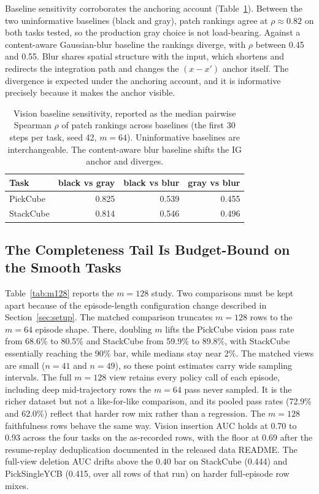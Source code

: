 \documentclass{article}
\begin{document}
Baseline sensitivity corroborates the anchoring account (Table~\ref{tab:baseline}).
Between the two uninformative baselines (black and gray), patch rankings agree at $\rho \approx 0.82$ on both tasks tested, so the production gray choice is not load-bearing.
Against a content-aware Gaussian-blur baseline the rankings diverge, with $\rho$ between 0.45 and 0.55.
Blur shares spatial structure with the input, which shortens and redirects the integration path and changes the $(x - x')$ anchor itself.
The divergence is expected under the anchoring account, and it is informative precisely because it makes the anchor visible.

\begin{table}[t!]
\centering
\small
\begin{tabular}{@{}l rrr@{}}
\toprule
\textbf{Task} & \textbf{black vs gray} & \textbf{black vs blur} & \textbf{gray vs blur} \\
\midrule
PickCube & 0.825 & 0.539 & 0.455 \\
\rowcolor{gray!6}
StackCube & 0.814 & 0.546 & 0.496 \\
\bottomrule
\end{tabular}
\caption{Vision baseline sensitivity, reported as the median pairwise Spearman $\rho$ of patch rankings across baselines (the first 30 steps per task, seed 42, $m{=}64$). Uninformative baselines are interchangeable. The content-aware blur baseline shifts the IG anchor and diverges.}
\label{tab:baseline}
\end{table}

\subsection{The Completeness Tail Is Budget-Bound on the Smooth Tasks}
\label{sec:budget}

Table~\ref{tab:m128} reports the $m{=}128$ study.
Two comparisons must be kept apart because of the episode-length configuration change described in Section~\ref{sec:setup}.
The matched comparison truncates $m{=}128$ rows to the $m{=}64$ episode shape.
There, doubling $m$ lifts the PickCube vision pass rate from 68.6\% to 80.5\% and StackCube from 59.9\% to 89.8\%, with StackCube essentially reaching the 90\% bar, while medians stay near 2\%.
The matched views are small ($n{=}41$ and $n{=}49$), so these point estimates carry wide sampling intervals.
The full $m{=}128$ view retains every policy call of each episode, including deep mid-trajectory rows the $m{=}64$ pass never sampled.
It is the richer dataset but not a like-for-like comparison, and its pooled pass rates (72.9\% and 62.0\%) reflect that harder row mix rather than a regression.
The $m{=}128$ faithfulness rows behave the same way.
Vision insertion AUC holds at 0.70 to 0.93 across the four tasks on the as-recorded rows, with the floor at 0.69 after the resume-replay deduplication documented in the released data README. The full-view deletion AUC drifts above the 0.40 bar on StackCube (0.444) and PickSingleYCB (0.415, over all rows of that run) on harder full-episode row mixes.
\end{document}
